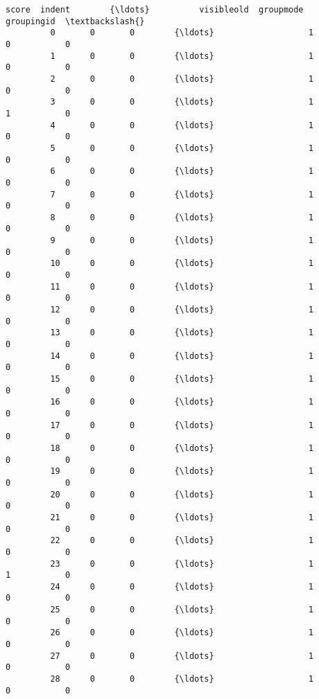 \documentclass[11pt]{article}
\begin{document}
\begin{Verbatim}[commandchars=\\\{\}]
             score  indent        {\ldots}          visibleold  groupmode  groupingid  \textbackslash{}
         0       0       0        {\ldots}                   1          0           0   
         1       0       0        {\ldots}                   1          0           0   
         2       0       0        {\ldots}                   1          0           0   
         3       0       0        {\ldots}                   1          1           0   
         4       0       0        {\ldots}                   1          0           0   
         5       0       0        {\ldots}                   1          0           0   
         6       0       0        {\ldots}                   1          0           0   
         7       0       0        {\ldots}                   1          0           0   
         8       0       0        {\ldots}                   1          0           0   
         9       0       0        {\ldots}                   1          0           0   
         10      0       0        {\ldots}                   1          0           0   
         11      0       0        {\ldots}                   1          0           0   
         12      0       0        {\ldots}                   1          0           0   
         13      0       0        {\ldots}                   1          0           0   
         14      0       0        {\ldots}                   1          0           0   
         15      0       0        {\ldots}                   1          0           0   
         16      0       0        {\ldots}                   1          0           0   
         17      0       0        {\ldots}                   1          0           0   
         18      0       0        {\ldots}                   1          0           0   
         19      0       0        {\ldots}                   1          0           0   
         20      0       0        {\ldots}                   1          0           0   
         21      0       0        {\ldots}                   1          0           0   
         22      0       0        {\ldots}                   1          0           0   
         23      0       0        {\ldots}                   1          1           0   
         24      0       0        {\ldots}                   1          0           0   
         25      0       0        {\ldots}                   1          0           0   
         26      0       0        {\ldots}                   1          0           0   
         27      0       0        {\ldots}                   1          0           0   
         28      0       0        {\ldots}                   1          0           0   

\end{Verbatim}
\end{document}
